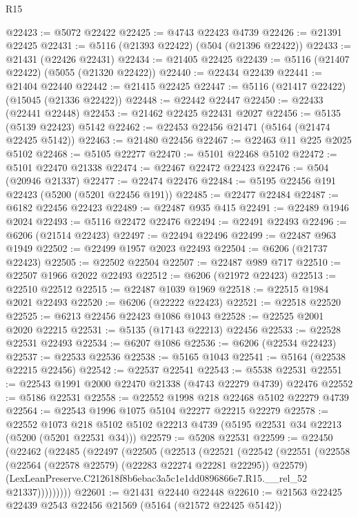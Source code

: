 \begin{lexlean}{R15}
\begin{coremodule}
{{{{{{{{{{{@22423 := @5072 @22422
@22425 := @4743 @22423 @4739
@22426 := @21391 @22425
@22431 := @5116 (@21393 @22422) (@504 (@21396 @22422))
@22433 := @21431 (@22426 @22431)
@22434 := @21405 @22425
@22439 := @5116 (@21407 @22422) (@5055 (@21320 @22422))
@22440 := @22434 @22439
@22441 := @21404 @22440
@22442 := @21415 @22425
@22447 := @5116 (@21417 @22422) (@15045 (@21336 @22422))
@22448 := @22442 @22447
@22450 := @22433 (@22441 @22448)
@22453 := @21462 @22425 @22431 @2027
@22456 := @5135 (@5139 @22423) @5142
@22462 := @22453 @22456 @21471 (@5164 (@21474 @22425 @5142))
@22463 := @21480 @22456
@22467 := @22463 @11 @225 @2025 @5102
@22468 := @5105 @22277
@22470 := @5101 @22468 @5102
@22472 := @5101 @22470 @21338
@22474 := @22467 @22472 @22423
@22476 := @504 (@20946 @21337)
@22477 := @22474 @22476
@22484 := @5195 @22456 @191 @22423 (@5200 (@5201 @22456 @191))
@22485 := @22477 @22484
@22487 := @6182 @22456 @22423
@22489 := @22487 @935 @415
@22491 := @22489 @1946 @2024
@22493 := @5116 @22472 @22476
@22494 := @22491 @22493
@22496 := @6206 (@21514 @22423)
@22497 := @22494 @22496
@22499 := @22487 @963 @1949
@22502 := @22499 @1957 @2023 @22493
@22504 := @6206 (@21737 @22423)
@22505 := @22502 @22504
@22507 := @22487 @989 @717
@22510 := @22507 @1966 @2022 @22493
@22512 := @6206 (@21972 @22423)
@22513 := @22510 @22512
@22515 := @22487 @1039 @1969
@22518 := @22515 @1984 @2021 @22493
@22520 := @6206 (@22222 @22423)
@22521 := @22518 @22520
@22525 := @6213 @22456 @22423 @1086 @1043
@22528 := @22525 @2001 @2020 @22215
@22531 := @5135 (@17143 @22213) @22456
@22533 := @22528 @22531 @22493
@22534 := @6207 @1086
@22536 := @6206 (@22534 @22423)
@22537 := @22533 @22536
@22538 := @5165 @1043
@22541 := @5164 (@22538 @22215 @22456)
@22542 := @22537 @22541
@22543 := @5538 @22531
@22551 := @22543 @1991 @2000 @22470 @21338 (@4743 @22279 @4739) @22476
@22552 := @5186 @22531
@22558 := @22552 @1998 @218 @22468 @5102 @22279 @4739
@22564 := @22543 @1996 @1075 @5104 @22277 @22215 @22279
@22578 := @22552
    @1073
    @218
    @5102
    @5102
    @22213
    @4739
    (@5195 @22531 @34 @22213 (@5200 (@5201 @22531 @34)))
@22579 := @5208 @22531
@22599 := @22450
    (@22462
      (@22485
        (@22497
          (@22505
            (@22513
              (@22521
                (@22542
                  (@22551
                    (@22558 (@22564 (@22578 @22579) (@22283 @22274 @22281 @22295)) @22579)
                    (LexLeanPreserve.C212618f8b6ebac3a5c1e1dd0896866e7.R15.__rel_52 @21337)))))))))
@22601 := @21431 @22440 @22448
@22610 := @21563 @22425 @22439 @2543 @22456 @21569 (@5164 (@21572 @22425 @5142))
}}}}}}}}}}}
\end{coremodule}
\end{lexlean}
